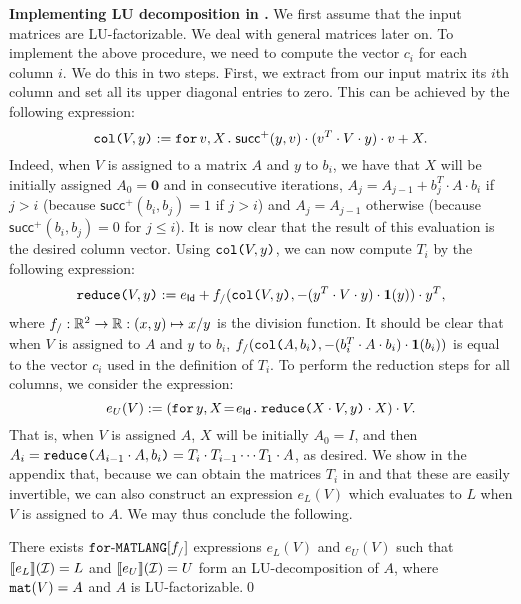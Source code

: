 \smallskip
\noindent
\textbf{Implementing LU decomposition in \langfor.} 
We first assume that the input matrices are LU-factorizable. We deal with general matrices later on.
To implement the above procedure, we need to compute the vector $c_i$ for each column $i$. We do this in two steps. First, we extract from our input matrix its $i$th column and set all its upper diagonal entries to zero. This can be achieved by the following expression:
$$\ccol{V}{y} := \ffor{v}{X}{\mathsf{succ}^+(y,v)\cdot(v^T\cdot V \cdot y)\cdot v + X}.$$
Indeed, when $V$ is assigned to a matrix $A$ and $y$ to $b_i$, we have that $X$ will be initially assigned
$A_0=\mathbf{0}$ and in consecutive iterations,  $A_j=A_{j-1}+ b_j^T\cdot A\cdot b_i$ if $j>i$ (because $\mathsf{succ}^+(b_i,b_j)=1$ if $j>i$) and $A_j=A_{j-1}$ otherwise (because $\mathsf{succ}^+(b_i,b_j)=0$ for $j\leq i$). It is now clear that the result of this evaluation is the desired column vector.
%
%
Using $\ccol{V}{y}$, we can now compute $T_i$ by the following expression:
$$\red{V}{y} := e_{\mathsf{Id}}+ f_/(\ccol{V}{y},-(y^T\cdot V\cdot y)\cdot \ones(y))\cdot y^T,$$
where $f_/:\RR^2\to\RR:(x,y)\mapsto x/y$ is the division function. It should be clear that when $V$ is assigned to $A$ and $y$ to $b_i$, $f_/(\ccol{A}{b_i},-(b_i^T\cdot A\cdot b_i)\cdot \ones(b_i))$ is equal to the vector $c_i$ used in the definition of $T_i$. To perform the reduction steps for all columns, we consider
the expression:
$$
e_{U}(V) :=  \left( \initf{e_{\mathsf{Id}}}{y}{X}{\red{X\cdot V}{y}\cdot X} \right) \cdot V.
$$
That is, when $V$ is assigned $A$, $X$ will be initially $A_0=I$, and then
$A_i=\red{A_{i-1}\cdot A}{b_i}=T_i\cdot T_{i-1}\cdots T_1\cdot A$, as desired.
We show in the appendix that, because we can obtain the matrices $T_i$ in \langfor and that these
are easily invertible, we can also construct an expression $e_L(V)$ which evaluates to $L$ when $V$ is assigned to
$A$. We may thus conclude the following.
\begin{proposition}\label{prop:gauss}
There exists $\langforf{f_/}$ expressions $e_L(V)$ and $e_U(V)$ such that
$\sem{e_L}{\I}=L$ and $\sem{e_U}{\I}=U$ form an LU-decomposition of $A$,
where $\conc(V)=A$ and $A$ is LU-factorizable.\qed
\end{proposition}
